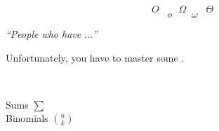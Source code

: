 
\begin{frame}{}

  \pause
  \vspace{-0.50cm}
  \[
    O \qquad \Omega \qquad \Theta
  \]
  \[
    o \qquad \omega
  \]
\end{frame}

\begin{frame}{}
  \begin{center}
      {\it \large ``People who  have  $\ldots$''}
  \end{center}


  \begin{center}
  \end{center}
\end{frame}

\begin{frame}{}

  \begin{center}
    {\large Unfortunately, you have to master some .}
  \end{center}
\end{frame}

\begin{frame}{}

  \begin{center}
     \\[15pt]  \pause

    \textcolor{blue!50}{Sums \qquad $\sum$} \\[8pt]  \pause
    \textcolor{blue!50}{Binomials \qquad $\binom{n}{k}$}
  \end{center}
\end{frame}
